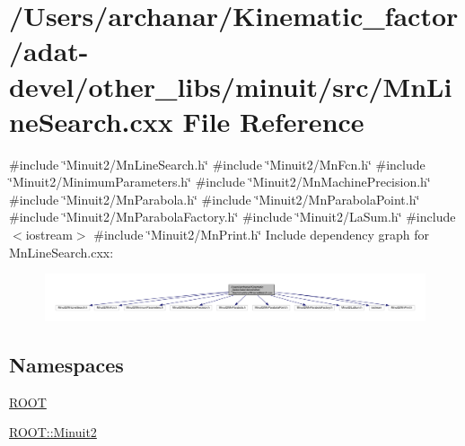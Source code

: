 \hypertarget{adat-devel_2other__libs_2minuit_2src_2MnLineSearch_8cxx}{}\section{/\+Users/archanar/\+Kinematic\+\_\+factor/adat-\/devel/other\+\_\+libs/minuit/src/\+Mn\+Line\+Search.cxx File Reference}
\label{adat-devel_2other__libs_2minuit_2src_2MnLineSearch_8cxx}
{\ttfamily \#include \char`\"{}Minuit2/\+Mn\+Line\+Search.\+h\char`\"{}}\newline
{\ttfamily \#include \char`\"{}Minuit2/\+Mn\+Fcn.\+h\char`\"{}}\newline
{\ttfamily \#include \char`\"{}Minuit2/\+Minimum\+Parameters.\+h\char`\"{}}\newline
{\ttfamily \#include \char`\"{}Minuit2/\+Mn\+Machine\+Precision.\+h\char`\"{}}\newline
{\ttfamily \#include \char`\"{}Minuit2/\+Mn\+Parabola.\+h\char`\"{}}\newline
{\ttfamily \#include \char`\"{}Minuit2/\+Mn\+Parabola\+Point.\+h\char`\"{}}\newline
{\ttfamily \#include \char`\"{}Minuit2/\+Mn\+Parabola\+Factory.\+h\char`\"{}}\newline
{\ttfamily \#include \char`\"{}Minuit2/\+La\+Sum.\+h\char`\"{}}\newline
{\ttfamily \#include $<$iostream$>$}\newline
{\ttfamily \#include \char`\"{}Minuit2/\+Mn\+Print.\+h\char`\"{}}\newline
Include dependency graph for Mn\+Line\+Search.\+cxx\+:
\nopagebreak
\begin{figure}[H]
\begin{center}
\leavevmode
\includegraphics[width=350pt]{df/de1/adat-devel_2other__libs_2minuit_2src_2MnLineSearch_8cxx__incl}
\end{center}
\end{figure}
\subsection*{Namespaces}
\begin{DoxyCompactItemize}
\item 
 \mbox{\hyperlink{namespaceROOT}{R\+O\+OT}}
\item 
 \mbox{\hyperlink{namespaceROOT_1_1Minuit2}{R\+O\+O\+T\+::\+Minuit2}}
\end{DoxyCompactItemize}
